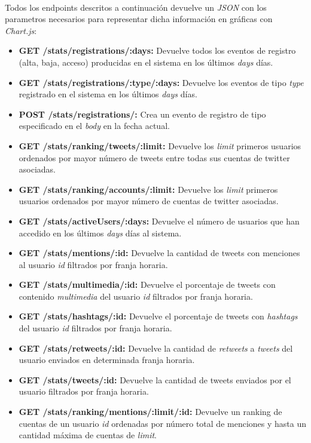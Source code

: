\documentclass[a4paper]{article}
\begin{document}
	\paragraph{} Todos los endpoints descritos a continuación devuelve un \textit{JSON} con los parametros necesarios para representar dicha información en gráficas con \textit{Chart.js}:
	
	\begin{itemize}
		\item \textbf{GET /stats/registrations/:days:} Devuelve todos los eventos de registro (alta, baja, acceso) producidas en el sistema en los últimos \textit{days} días.
		\item \textbf{GET /stats/registrations/:type/:days:} Devuelve los eventos de tipo \textit{type} registrado en el sistema en los últimos \textit{days} días.
		\item \textbf{POST /stats/registrations/:} Crea un evento de registro de tipo especificado en el \textit{body} en la fecha actual.
		\item \textbf{GET /stats/ranking/tweets/:limit:} Devuelve los \textit{limit} primeros usuarios ordenados por mayor número de tweets entre todas sus cuentas de twitter asociadas.
		\item \textbf{GET /stats/ranking/accounts/:limit:} Devuelve los \textit{limit} primeros usuarios ordenados por mayor número de cuentas de twitter asociadas.
		\item \textbf{GET /stats/activeUsers/:days:} Devuelve el número de usuarios que han accedido en los últimos \textit{days} días al sistema.
		\item \textbf{GET /stats/mentions/:id:} Devuelve la cantidad de tweets con menciones al usuario \textit{id} filtrados por franja horaria.
		\item \textbf{GET /stats/multimedia/:id:} Devuelve el porcentaje de tweets con contenido \textit{multimedia} del usuario \textit{id} filtrados por franja horaria.
		\item \textbf{GET /stats/hashtags/:id:} Devuelve el porcentaje de tweets con \textit{hashtags} del usuario \textit{id} filtrados por franja horaria.
		\item \textbf{GET /stats/retweets/:id:} Devuelve la cantidad de \textit{retweets} a \textit{tweets} del usuario enviados en determinada franja horaria.
		\item \textbf{GET /stats/tweets/:id:} Devuelve la cantidad de tweets enviados por el usuario filtrados por franja horaria.
		\item \textbf{GET /stats/ranking/mentions/:limit/:id:} Devuelve un ranking de cuentas de un usuario \textit{id} ordenadas por número total de menciones y hasta un cantidad máxima de cuentas de \textit{limit}.
	\end{itemize}
\end{document}
